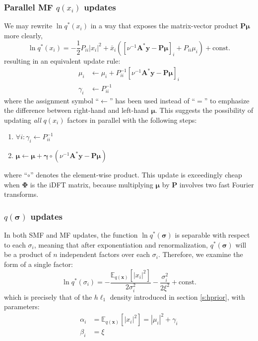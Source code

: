 \documentclass{article}
\newcommand{\m}[1]{\boldsymbol{#1}}
\newcommand{\E}[2]{\mathbb{E}_{#2}\left[ #1 \right]}
\begin{document}
\subsubsection{Parallel MF $q(x_i)$ updates}
We may rewrite $\ln q^*(x_i)$ in a way that exposes the matrix-vector
product $\m{P} \m{\mu}$ more clearly,
\begin{equation*}
\ln q^*(x_i) =
 -\frac{1}{2} P_{ii} |x_i|^2
 +\bar{x}_i \left(
   \left[ \nu^{-1} \m{A}^* \m{y} - \m{P} \m{\mu} \right]_i
     + P_{ii} \mu_i
   \right)
 +\text{const.}
\end{equation*}
resulting in an equivalent update rule:
\begin{equation*}
\begin{aligned}
\mu_i &\gets \mu_i +
 P_{ii}^{-1} \left[ \nu^{-1} \m{A}^* \m{y} - \m{P} \m{\mu} \right]_i
\\
\gamma_i &\gets P_{ii}^{-1}
\end{aligned}
\end{equation*}
where the assignment symbol ``$\gets$'' has been used instead of ``$=$''
to emphasize the difference between right-hand and left-hand $\m{\mu}$.
This suggests the possibility of updating \emph{all} $q(x_i)$ factors
in parallel with the following steps:
\begin{enumerate}
 \item $\forall i : \gamma_i \gets P_{ii}^{-1}$
 \item $\m{\mu} \gets \m{\mu} + \m{\gamma} \circ \left(
         \nu^{-1} \m{A}^* \m{y} - \m{P} \m{\mu}
        \right)$
\begin{equation*}
\end{equation*}
\end{enumerate}
where ``$\circ$'' denotes the element-wise product. This update is
exceedingly cheap when $\m{\Phi}$ is the iDFT matrix, because multiplying
$\m{\mu}$ by $\m{P}$ involves two fast Fourier transforms.

\subsubsection{$q(\m{\sigma})$ updates}
In both SMF and MF updates, the function $\ln q^*(\m{\sigma})$ is separable
with respect to each $\sigma_i$, meaning that after exponentiation and
renormalization, $q^*(\m{\sigma})$ will be a product of $n$ independent
factors over each $\sigma_i$. Therefore, we examine the form of a
single factor:
\begin{equation*}
\ln q^*(\sigma_i) =
 -\frac{\E{|x_i|^2}{q(\m{x})}}{2 \sigma_i^2}
 -\frac{\sigma_i^2}{2 \xi^2}
 +\text{const.}
\end{equation*}
which is precisely that of the $h\ell_1$ density introduced in section
\ref{s:hprior}, with parameters:
\begin{equation*}
\begin{aligned}
\alpha_i &= \E{|x_i|^2}{q(\m{x})} = |\mu_i|^2 + \gamma_i
\\
\beta_i &= \xi
\end{aligned}
\end{equation*}
\end{document}
